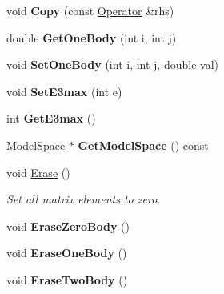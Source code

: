 \begin{DoxyCompactItemize}
\item 
\hypertarget{classOperator_a851708e76dd24603d0527f6c5c1bd544}{void {\bfseries Copy} (const \hyperlink{classOperator}{Operator} \&rhs)}\label{classOperator_a851708e76dd24603d0527f6c5c1bd544}

\item 
\hypertarget{classOperator_a34eb5fa0e6d415cd44e1a3034d1cf5c0}{double {\bfseries Get\-One\-Body} (int i, int j)}\label{classOperator_a34eb5fa0e6d415cd44e1a3034d1cf5c0}

\item 
\hypertarget{classOperator_ae85aa3d8fdaeb3cb6266c3a4494e904b}{void {\bfseries Set\-One\-Body} (int i, int j, double val)}\label{classOperator_ae85aa3d8fdaeb3cb6266c3a4494e904b}

\item 
\hypertarget{classOperator_a8b32ed75e5e0d6175a2f2f517c63a89c}{void {\bfseries Set\-E3max} (int e)}\label{classOperator_a8b32ed75e5e0d6175a2f2f517c63a89c}

\item 
\hypertarget{classOperator_a42d67df774701e40e2c49e539a68c937}{int {\bfseries Get\-E3max} ()}\label{classOperator_a42d67df774701e40e2c49e539a68c937}

\item 
\hypertarget{classOperator_a037a75a9f8a0dc970e56240552cc96d2}{\hyperlink{classModelSpace}{Model\-Space} $\ast$ {\bfseries Get\-Model\-Space} () const }\label{classOperator_a037a75a9f8a0dc970e56240552cc96d2}

\item 
\hypertarget{classOperator_a8a0f7d6aa5163929850d06b31dc24a55}{void \hyperlink{classOperator_a8a0f7d6aa5163929850d06b31dc24a55}{Erase} ()}\label{classOperator_a8a0f7d6aa5163929850d06b31dc24a55}

\begin{DoxyCompactList}\small\item\em Set all matrix elements to zero. \end{DoxyCompactList}\item 
\hypertarget{classOperator_aee08b8c721271c700f325e02ba7b47d1}{void {\bfseries Erase\-Zero\-Body} ()}\label{classOperator_aee08b8c721271c700f325e02ba7b47d1}

\item 
\hypertarget{classOperator_ab26470d0c88d61699443223675e57bbe}{void {\bfseries Erase\-One\-Body} ()}\label{classOperator_ab26470d0c88d61699443223675e57bbe}

\item 
\hypertarget{classOperator_a5c49da3f408b79a7430af4e3ec1ff8df}{void {\bfseries Erase\-Two\-Body} ()}\label{classOperator_a5c49da3f408b79a7430af4e3ec1ff8df}


\end{DoxyCompactItemize}
